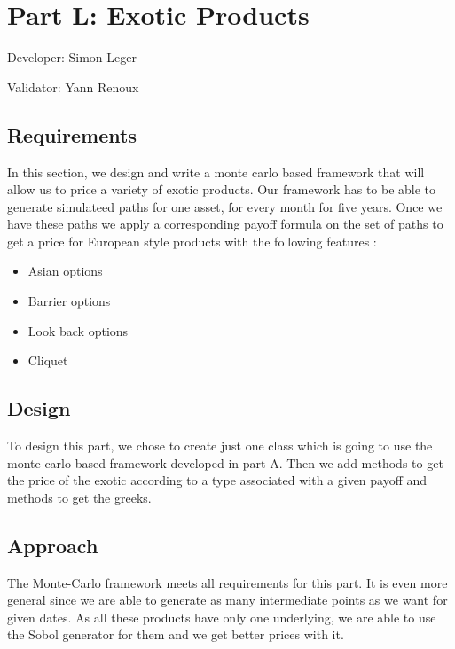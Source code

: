 \chapter{Part L: Exotic Products}
Developer: Simon Leger

\noindent Validator: Yann Renoux



\section{Requirements}

In this section, we design and write a monte carlo based framework that will allow us to price a variety of exotic products. Our framework has to be able to generate
simulateed paths for one asset, for every month for five years. Once we have these paths we apply a corresponding payoff formula on the set of paths to get a price for European style products with the following features :
\begin{itemize}
	\item Asian options
	\item Barrier options
	\item Look back options
	\item Cliquet
\end{itemize}


\section{Design }

To design this part, we chose to create just one class which is going to use the 
monte carlo based framework developed in part A. Then we add methods to get the price of the 
exotic according to a type associated with a given payoff and methods to get the greeks.

\section{Approach}

The Monte-Carlo framework meets all requirements for this part. It is even more general
since we are able to generate as many intermediate points as we want for given dates.
As all these products have only one underlying, we are able to use the Sobol generator for them and we get better prices with it.

